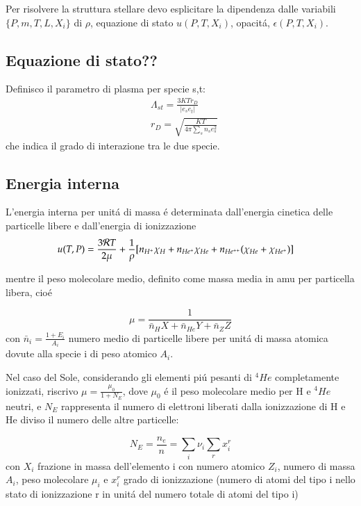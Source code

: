 \documentclass[oneside,12pt]{memoir}
\begin{document}
Per risolvere la struttura stellare devo esplicitare la dipendenza dalle variabili $\{P,m,T,L,X_i\}$ di $\rho$, equazione di stato $u(P,T,X_i)$, opacit\'a, $\epsilon(P,T,X_i)$.

\subsection{Equazione di stato??}

Definisco il parametro di plasma per specie s,t:
\begin{align}
&\Lambda_{st}=\frac{3KTr_D}{|e_se_t|}\\
&r_D=\sqrt{\frac{KT}{4\pi\sum_sn_se_s^2}}
\end{align}
che indica il grado di interazione tra le due specie.

\subsection{Energia interna}

L'energia interna per unit\'a di massa \'e determinata dall'energia cinetica delle particelle libere e dall'energia di ionizzazione
\begin{align}
&u(T,P)=\frac{3\mathcal{R}{}T}{2\mu}+\frac{1}{\rho}[n_{H^+}\chi_H+n_{He^+}\chi_{He}+n_{He^{++}}(\chi_{He}+\chi_{He^+})]
\end{align}

mentre il peso molecolare medio, definito come massa media in amu per particella libera, cio\'e

\begin{equation}
\mu=\frac{1}{\bar{n}_HX+\bar{n}_{He}Y+\bar{n}_{Z}Z}\label{eq:meanmw}
\end{equation}
con $\bar{n}_i=\frac{1+E_i}{A_i}$ numero medio di particelle libere per unit\'a di massa atomica dovute alla specie i di peso atomico $A_i$.

Nel caso del Sole, considerando gli elementi pi\'u pesanti di $^4He$ completamente ionizzati, riscrivo $\mu=\frac{\mu_0}{1+N_E}$, dove $\mu_0$ \'e il peso molecolare medio per H e $^4He$ neutri, e $N_E$ rappresenta il numero di elettroni liberati dalla ionizzazione di H e He diviso il numero delle altre particelle:

\begin{equation}
N_E=\frac{n_e}{n}=\sum_i\nu_i\sum_rx_i^r
\end{equation}
con $X_i$ frazione in massa dell'elemento i con numero atomico $Z_i$, numero di massa $A_i$, peso molecolare $\mu_i$ e $x_i^r$ grado di ionizzazione (numero di atomi del tipo i nello stato di ionizzazione r in unit\'a del numero totale di atomi del tipo i)
\end{document}
